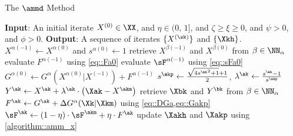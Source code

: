 \begin{algorithm}[t]
	\caption{The $\ammd$ Method}
	\label{algorithm::amm}
	\begin{algorithmic}[1]
		\State\textbf{Input}: An initial iterate $X^{(0)}\in \XX$, and $\eta\in(0,\,1]$, and $\zeta \geq \xi \geq 0$, and $\psi>0$, and $\phi>0$.
		 \vspace{0.1em}
		\State\textbf{Output}: A sequence of iterates $\{X^{(\sk)}\}$ and $\{\Xkh\}$.\vspace{0.2em} 	
		\vspace{0.1em}
		\State $X^{\alpha(-1)}\gets X^{\alpha(0)}$ and $s^{\alpha(0)}\gets 1$\label{line::alg5::s0}
		\vspace{0.1em}
		\State retrieve $X^{\beta(-1)}$ and $X^{\beta(0)}$ from $\beta\in\NN_{\alpha}$\label{line::alg5::comm1}
		\vspace{0.1em}
		\State evaluate $F^{\alpha(-1)}$ using \cref{eq::Fa0}\label{line::alg5::Fakp2}
		\vspace{0.1em}
		\State evaluate $\sF^{\alpha(-1)}$ using \cref{eq::sFa0}\label{line::alg5::lFa0}
		\vspace{0.1em}
		\State $G^{\alpha(0)} \leftarrow G^\alpha(X^{\alpha(0)}|X^{(-1)}) + F^{\alpha(-1)}$\label{line::alg5::G}
		\vspace{0.1em}
		\EndFor
		\vspace{0.1em}
		\State $s^{\akp}\gets\tfrac{\sqrt{4{s^{\ak}}^2+1}+1}{2}$,\; $\lambda^{\ak}\gets \tfrac{s^{\ak}-1}{s^{\akp}}$\label{line::alg5::sk}
		\vspace{0.1em}
		\State $Y^{\ak}\gets X^{\ak}+\lambda^{\ak}\cdot\big(\Xak-X^{\akm}\big)$\label{line::alg5::Yk}
		\vspace{0.1em}
		\State retrieve $\Xbk$ and $Y^{\bk}$ from $\beta\in\NN_{\alpha}$\label{line::alg5::comm}
		\vspace{0.1em}
		\State $F^{\ak}\leftarrow G^{\ak} + \Delta G^{\alpha}(\Xk|\Xkm)$ using \cref{eq::DGa,eq::Gakp} \label{line::alg5::Fakp1}
		\vspace{0.1em}
		\State $\sF^{\ak}\gets (1-\eta)\cdot \sF^{\akm} + \eta\cdot F^{\ak}$\label{line::alg5::lFakp}
		\vspace{0.1em}
		\State 	update $\Xakh$ and $\Xakp$ using \cref{algorithm::amm_x}
		\EndFor
		\EndFor
	\end{algorithmic}
\end{algorithm}
